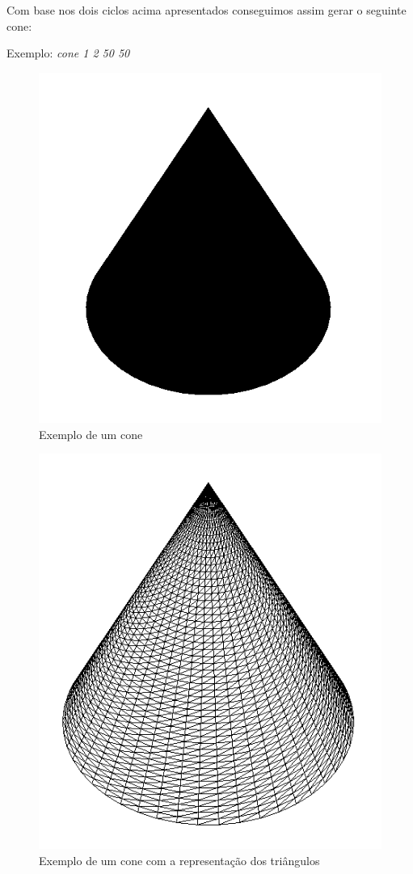 \documentclass{article}
\begin{document}
Com base nos dois ciclos acima apresentados conseguimos assim gerar o seguinte cone:

Exemplo: \textit{cone 1 2 50 50}
\begin{figure}[H]
\centering\includegraphics[scale=0.45]{coneP} 
\caption{\label{fig:controller}Exemplo de um cone}
\end{figure} \begin{figure}[H]
\centering\includegraphics[scale=0.4]{coneT} 
\caption{\label{fig:controller}Exemplo de um cone com a representação dos triângulos}
\end{figure}
\newpage
\end{document}
